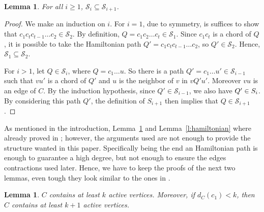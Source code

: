 \documentclass[11pt]{article}
\newtheorem{lemma}[theo]{Lemma}
\begin{document}
\begin{lemma}
    For all $i\geq 1$, $\mathcal S_i \subseteq \mathcal S_{i+1}$.
\end{lemma}

\begin{proof}
    We make an induction on $i$. 
    For $i=1$, due to symmetry, is suffices to show that $c_1c_t c_{t-1} \dots c_2 \in\mathcal S_2$.  By definition, $Q = c_1 c_2 \dots c_t\in\mathcal S_1$. Since $c_1c_t$ is a chord of $Q$, it is possible to take the Hamiltonian path $Q'=c_1c_t c_{t-1} \dots c_2$, so $Q' \in \mathcal S_2$. Hence, $\mathcal S_1\subseteq\mathcal S_2$.

    For $i>1$, let $Q \in\mathcal S_i$, where $Q=c_1\ldots u$. So there is a path $Q' = c_1 \dots u' \in\mathcal S_{i-1}$ such that $vu'$ is a chord of $Q'$ and $u$ is the neighbor of $v$ in $vQ'u'$. Moreover $vu$ is an edge of $C$.  By the induction hypothesis, since $Q'\in\mathcal S_{i-1}$, we also have $Q'\in\mathcal \mathcal S_i$. By considering this path $Q'$, the definition of $S_{i+1}$ then implies that $Q\in \mathcal S_{i+1}$.
\end{proof}

As mentioned in the introduction, Lemma~\ref{lem:kactive} and Lemma~\ref{l:hamiltonian} where already proved in \cite{GUPTA198037}; however, the arguments used are not enough to provide the structure wanted in this paper. Specifically being the end an Hamiltonian path is enough to guarantee a high degree, but not enough to ensure the edges contractions used later. Hence, we have to keep the proofs of the next two lemmas, even tough they look similar to the ones in \cite{GUPTA198037}.

\begin{lemma}\label{lem:kactive}
    $C$ contains at least $k$ active vertices. Moreover, if $d_C(c_1) < k$, then $C$ contains at least $k+1$ active vertices.   
\end{lemma}
\end{document}

